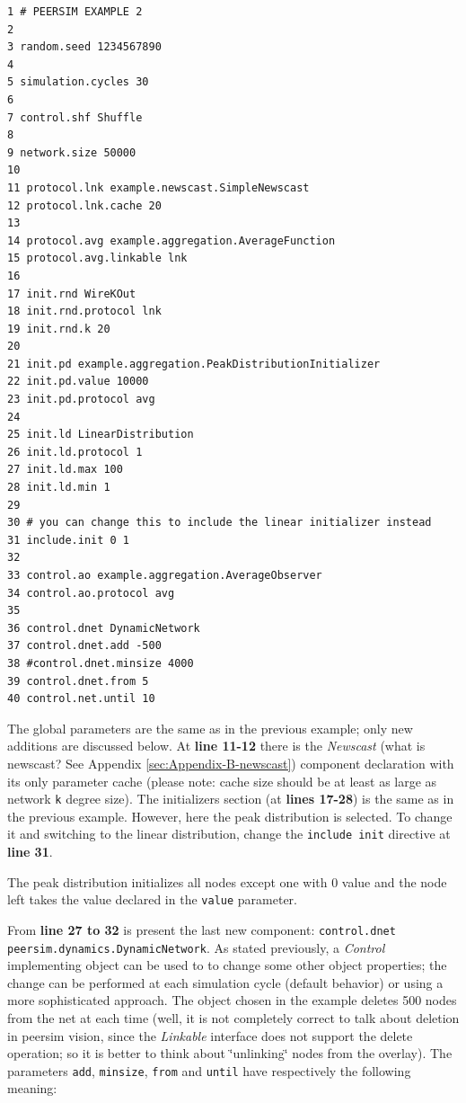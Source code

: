 \documentclass[a4paper,11pt]{article}
\begin{document}
\footnotesize
\begin{verbatim}
1 # PEERSIM EXAMPLE 2
2
3 random.seed 1234567890
4
5 simulation.cycles 30
6
7 control.shf Shuffle
8
9 network.size 50000
10 
11 protocol.lnk example.newscast.SimpleNewscast
12 protocol.lnk.cache 20
13
14 protocol.avg example.aggregation.AverageFunction
15 protocol.avg.linkable lnk
16
17 init.rnd WireKOut
18 init.rnd.protocol lnk
19 init.rnd.k 20
20
21 init.pd example.aggregation.PeakDistributionInitializer
22 init.pd.value 10000
23 init.pd.protocol avg
24
25 init.ld LinearDistribution
26 init.ld.protocol 1
27 init.ld.max 100
28 init.ld.min 1
29
30 # you can change this to include the linear initializer instead
31 include.init 0 1 
32
33 control.ao example.aggregation.AverageObserver
34 control.ao.protocol avg
35
36 control.dnet DynamicNetwork
37 control.dnet.add -500
38 #control.dnet.minsize 4000
39 control.dnet.from 5
40 control.net.until 10
\end{verbatim}
\normalsize

The global parameters are the same as in the previous example; only
new additions are discussed below. At \textbf{line 11-12} there is the
\emph{Newscast} (what is newscast? See Appendix \ref{sec:Appendix-B-newscast}) 
component declaration with its 
only parameter cache (please note: cache size should be at least as
large as network \texttt{k} degree size). 
The initializers section (at \textbf{lines 17-28}) is the same as in
the previous example. However, here the peak distribution is
selected. To change it and switching to the linear distribution,
change the \texttt{include init} directive at \textbf{line 31}.

The
peak distribution initializes all nodes except one with 0 value and
the node left takes the value declared in the \texttt{value} parameter.

From \textbf{line 27 to 32} is present the last new component: 
\texttt{control.dnet
peersim.dynamics.DynamicNetwork}. As stated previously, a \emph{Control}
implementing object can be used to to change some other object
properties; the change can be performed at each simulation cycle (default
behavior) or using a more sophisticated approach. The object chosen
in the example deletes 500 nodes from the net at each time (well,
it is not completely correct to talk about deletion in peersim vision,
since the \emph{Linkable} interface does not support the delete
operation; so it is better to think about \char`\"{}unlinking\char`\"{} 
nodes from the overlay). The parameters \texttt{add}, \texttt{minsize},
\texttt{from} and \texttt{until} have respectively the following meaning:
\end{document}

